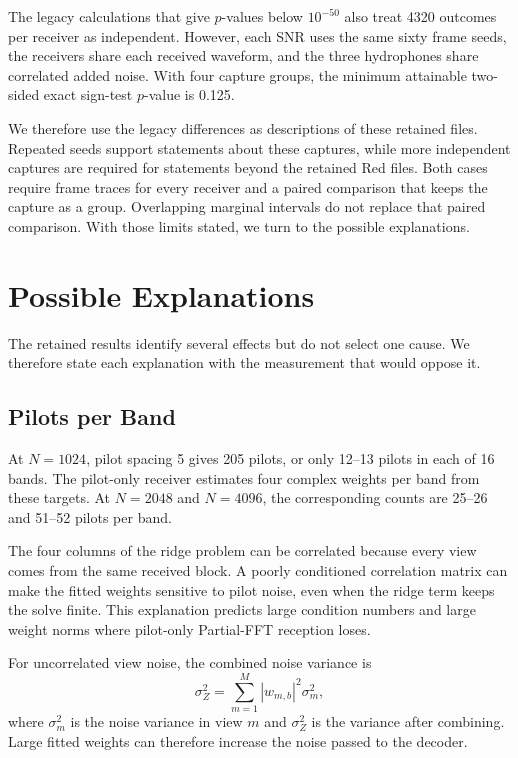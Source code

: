 \documentclass[11pt]{article}
\begin{document}
The legacy calculations that give $p$-values below $10^{-50}$ also treat
4320 outcomes per receiver as independent.  However, each SNR uses the same sixty
frame seeds, the receivers share each received waveform, and the three hydrophones
share correlated added noise.  With four capture groups, the minimum
attainable two-sided exact sign-test $p$-value is 0.125.

We therefore use the legacy differences as descriptions of these retained
files.  Repeated seeds support statements about these captures, while more
independent captures are required for statements beyond the retained Red
files.  Both cases require frame traces for every receiver and a paired comparison
that keeps the capture as a group.  Overlapping marginal intervals do not
replace that paired comparison.  With those limits stated, we turn to the
possible explanations.

\section{Possible Explanations}

The retained results identify several effects but do not select one cause.
We therefore state each explanation with the measurement that would oppose
it.

\subsection{Pilots per Band}

At $N=1024$, pilot spacing 5 gives 205 pilots, or only 12--13 pilots in each
of 16 bands.  The pilot-only receiver estimates four complex weights per band
from these targets.  At $N=2048$ and $N=4096$, the corresponding counts are
25--26 and 51--52 pilots per band.

The four columns of the ridge problem can be correlated because every view
comes from the same received block.  A poorly conditioned correlation matrix
can make the fitted weights sensitive to pilot noise, even when the ridge term
keeps the solve finite.  This explanation predicts large condition numbers and
large weight norms where pilot-only Partial-FFT reception loses.

For uncorrelated view noise, the combined noise variance is
\begin{equation}
  \sigma_Z^2
  =
  \sum_{m=1}^{M}|w_{m,b}|^2\sigma_m^2,
  \label{eq:noise-gain}
\end{equation}
where $\sigma_m^2$ is the noise variance in view $m$ and $\sigma_Z^2$ is the
variance after combining.  Large fitted weights can therefore increase the
noise passed to the decoder.
\end{document}

